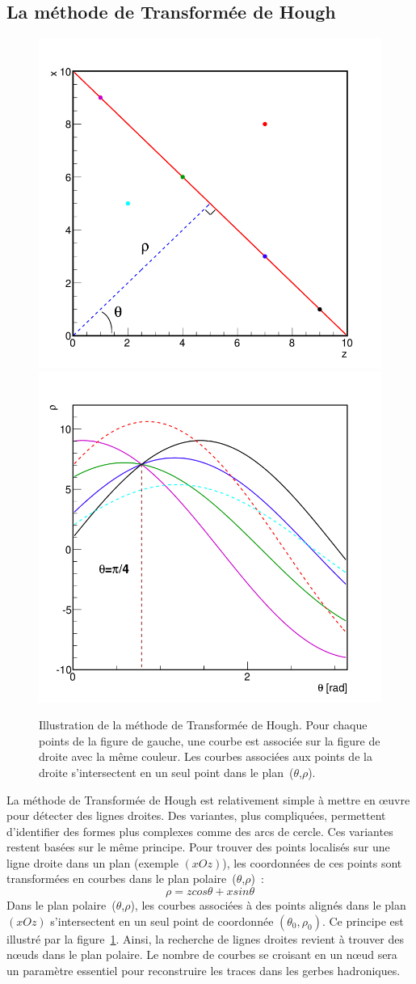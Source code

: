 \subsection{La méthode de Transformée de Hough}
\begin{figure}[!ht]
  \includegraphics[width=.5\textwidth]{Shower/figs/HTexample.jpg}
  \includegraphics[width=.5\textwidth]{Shower/figs/HTspace.jpg}
  \caption{Illustration de la méthode de Transformée de Hough. Pour chaque points de la figure de gauche, une courbe est associée sur la figure de droite avec la même couleur. Les courbes associées aux points de la droite s'intersectent en un seul point dans le plan~($\theta$,$\rho$).}
  \label{fig.ht_example}
\end{figure}
La méthode de Transformée de Hough est relativement simple à mettre en œuvre pour détecter des lignes droites. Des variantes, plus compliquées, permettent d'identifier des formes plus complexes comme des arcs de cercle. Ces variantes restent basées sur le même principe. Pour trouver des points localisés sur une ligne droite dans un plan (exemple $(xOz)$), les coordonnées de ces points sont transformées en courbes dans le plan polaire~($\theta$,$\rho$)~\cite{houghDuda}:
\begin{equation}
  \label{eq.hough}
  \rho=zcos\theta + xsin\theta
\end{equation} 
Dans le plan polaire~($\theta$,$\rho$), les courbes associées à des points alignés dans le plan $(xOz)$ s'intersectent en un seul point de coordonnée $(\theta_0,\rho_0)$. Ce principe est illustré par la figure~\ref{fig.ht_example}. Ainsi, la recherche de lignes droites revient à trouver des nœuds dans le plan polaire. Le nombre de courbes se croisant en un nœud sera un paramètre essentiel pour reconstruire les traces dans les gerbes hadroniques.

